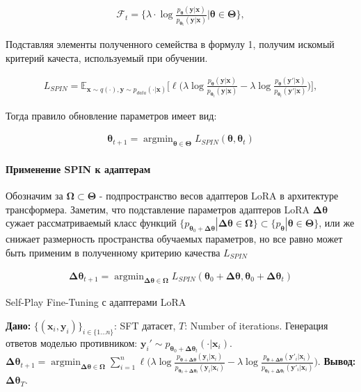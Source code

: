 \documentclass[12pt, twoside]{article}
\newcommand{\bx}{\mathbf{x}}
\newcommand{\by}{\mathbf{y}}
\newcommand{\bOmega}{\boldsymbol{\Omega}}
\newcommand{\btheta}{\boldsymbol{\theta}}
\newcommand{\bTheta}{\boldsymbol{\Theta}}
\newcommand{\bDelta}{\boldsymbol{\Delta}}
\newcommand{\cF}{\mathcal{F}}
\newcommand{\EE}{\mathbb{E}}
\newcommand{\argmin}{\mathop{\mathrm{argmin}}}
\begin{document}
\begin{align}
\cF_{t} = \bigg\{\lambda\cdot \log \frac{p_{\btheta}(\by | \bx)}{p_{\mathrm{\btheta_t}}(\by | \bx)}\bigg|\btheta \in \bTheta\bigg\},   \label{eq:function class0} 
\end{align}

Подставляя элементы полученного семейства в формулу 1, получим искомый критерий качеста, используемый при обучении.

\begin{align}
L_{SPIN}= \EE_{\bx\sim q(\cdot), \by\sim p_{data}(\cdot | \bx)}\bigg[\ell\bigg(\lambda \log \frac{p_{\btheta}(\by | \bx)}{p_{\btheta_t}(\by | \bx)}-\lambda \log \frac{p_{\btheta}(\by' | \bx)}{p_{\btheta_t}(\by' | \bx)}\bigg)\bigg], \label{eq:loss}  
\end{align}

Тогда правило обновление параметров имеет вид:

\begin{align}
    \btheta_{t+1} = \argmin_{\btheta \in \bTheta} L_{SPIN} (\btheta, \btheta_t)
\end{align}


\paragraph{Применение SPIN к адаптерам}

Обозначим за $\bOmega \subset \bTheta$ - подпространство весов адаптеров LoRA в архитектуре трансформера. Заметим, что подставление параметров адаптеров LoRA $\bDelta\btheta$ сужает рассматриваемый класс функций $\{p_{\btheta_0 + \bDelta\btheta} | \bDelta\btheta \in \bOmega\} \subset \{p_{\btheta} | \btheta \in \bTheta\}$, или же снижает размерность пространства обучаемых параметров, но все равно может быть применим в полученному критерию качества $L_{SPIN}$

\begin{align}
    \bDelta\btheta_{t+1} = \argmin_{\bDelta\btheta \in \bOmega} L_{SPIN} (\btheta_0 + \bDelta\btheta, \btheta_0 + \bDelta \btheta_t)
\end{align}

\begin{algorithm}[ht!]
\caption{Self-Play Fine-Tuning с адаптерами LoRA}\label{alg:Improving}
\begin{algorithmic}%
\STATE \textbf{Дано:} $\{(\bx_i, \by_i)\}_{i\in \{1 ... n\}}$: SFT датасет, $T$: Number of iterations. 
\STATE Генерация ответов моделью противником: $\by_{i}' \sim p_{\btheta_0 + \bDelta \btheta_t}(\cdot|\bx_i)$.
\ENDFOR 
\STATE  $\bDelta\btheta_{t+1} = \argmin_{\bDelta\btheta \in \bOmega} \sum_{i = 1}^n\ell\Big(\lambda \log \frac{p_{\btheta + \bDelta \btheta}(\by_i | \bx_i)}{p_{\btheta_0 + \bDelta \btheta_t}(\by_i | \bx_i)}-\lambda \log \frac{p_{\btheta + \bDelta \btheta}(\by'_i | \bx_i)}{p_{\btheta_0 + \bDelta \btheta_t}(\by'_i | \bx_i)}\Big)$.
\ENDFOR
\STATE \textbf{Вывод:} $\bDelta \btheta_T$.
\end{algorithmic}
\end{algorithm}
\end{document}
